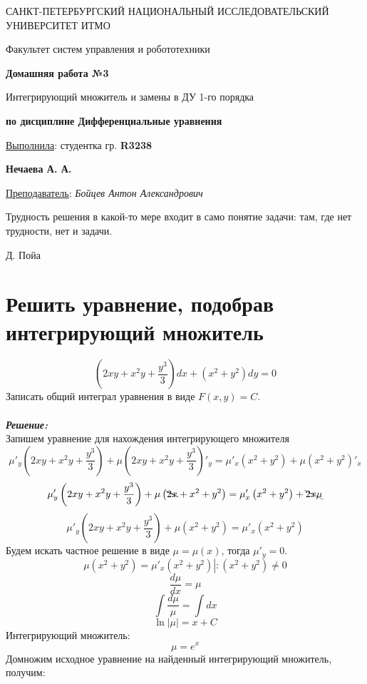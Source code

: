 \documentclass[a5paper, 10pt]{article}
\theoremstyle{definition}
\theoremstyle{plain}
\theoremstyle{remark}
\newcommand*{\titlePage}{
	\thispagestyle{title}
	\begingroup
	\begin{center}
		\vspace*{6ex}
		
		{\small
			САНКТ-ПЕТЕРБУРГСКИЙ НАЦИОНАЛЬНЫЙ ИССЛЕДОВАТЕЛЬСКИЙ УНИВЕРСИТЕТ ИТМО	
		}
		
		\vspace*{2ex}
		
		{\normalsize
			Факультет систем управления и робототехники
		}
		
		\vspace*{15ex}
		
		{\Large \bfseries 
			Домашняя работа №3
		}
\vspace*{3ex}
		
		{ \Large 
			Интегрирующий множитель и замены в ДУ 1-го порядка
		}
\vspace*{3ex}
		
		{  \bfseries 
			по дисциплине Дифференциальные уравнения
		}
	\end{center}
	\vspace*{20ex}
	\begin{flushright}
		{\large 
			\underline{Выполнила}: студентка гр. \textbf{R3238}\\
			\begin{flushright}
				\textbf{Нечаева А. А.}\\
			\end{flushright}
		}
		
		\vspace*{5ex}
		
		{\large 
			\underline{Преподаватель}: \textit{Бойцев Антон Александрович}
		}
	\end{flushright}	
	\newpage
	\setcounter{page}{1}
	\endgroup}
\begin{document}
	\titlePage
	\pagestyle{style}
	
\newpage
\epigraph{Трудность решения в какой-то мере входит в само понятие задачи: там, где нет трудности, нет и задачи.}{Д. Пойа}

\section{Решить уравнение, подобрав интегрирующий множитель}
\begin{equation*}
\left( 2xy + x^2y+\frac{y^3}{3} \right)dx + \left(x^2 + y^2 \right)dy = 0
\end{equation*}
Записать общий интеграл уравнения в виде $F(x, y) = C$.\\\\
\textit{\textbf{Решение:}}\\
Запишем уравнение для нахождения интегрирующего множителя
\begin{equation*}
\mu'_y \left( 2xy + x^2y+\frac{y^3}{3} \right) + \mu \left( 2xy + x^2y+\frac{y^3}{3} \right)'_y = \mu'_x \left(x^2 + y^2 \right) + \mu \left(x^2 + y^2 \right)'_x
\end{equation*}
\begin{equation*}
\mu'_y \left( 2xy + x^2y+\frac{y^3}{3} \right) + \mu \left(\bcancel{ 2x} + x^2+ y^2 \right) = \mu'_x \left(x^2 + y^2 \right) + \bcancel{2x \mu} 
\end{equation*}
\begin{equation*}
\mu'_y \left( 2xy + x^2y+\frac{y^3}{3} \right) + \mu \left(x^2+ y^2 \right) = \mu'_x \left(x^2 + y^2 \right)
\end{equation*}
Будем искать частное решение в виде $\mu = \mu (x)$, тогда $\mu'_y = 0$.
\begin{equation*}
 \mu \left(x^2+ y^2 \right) = \mu'_x \left(x^2 + y^2 \right) \left| : (x^2 + y^2) \neq 0 \right.
\end{equation*}
\begin{equation*}
 \frac{d\mu}{dx} = \mu
\end{equation*}
\begin{equation*}
\int \frac{d\mu}{\mu} = \int dx
\end{equation*}
\begin{equation*}
\ln | \mu | = x + C
\end{equation*}
Интегрирующий множитель:
\begin{equation*}
 \mu = e^x
\end{equation*}
Домножим исходное уравнение на найденный интегрирующий множитель, получим:
\end{document}
